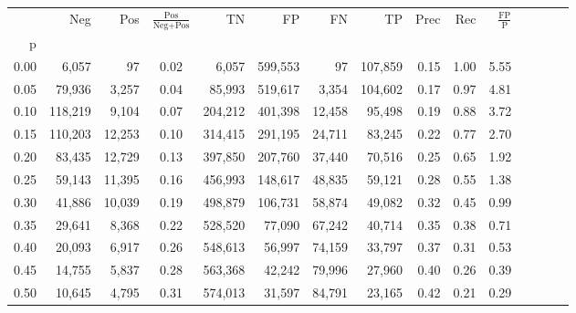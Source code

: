 \begin{tabular}{rrrcrrrrrrrrrrr}
\toprule
{} &      Neg &     Pos & $\frac{\text{Pos}}{\text{Neg}+\text{Pos}}$ &       TN &       FP &       FN &       TP &  Prec &   Rec & $\frac{\text{FP}}{\text{P}}$ \\
p    &          &         &                                            &          &          &          &          &       &       &                              \\
\midrule
0.00 &    6,057 &      97 &                                       0.02 &    6,057 &  599,553 &       97 &  107,859 &  0.15 &  1.00 &                         5.55 \\
0.05 &   79,936 &   3,257 &                                       0.04 &   85,993 &  519,617 &    3,354 &  104,602 &  0.17 &  0.97 &                         4.81 \\
0.10 &  118,219 &   9,104 &                                       0.07 &  204,212 &  401,398 &   12,458 &   95,498 &  0.19 &  0.88 &                         3.72 \\
0.15 &  110,203 &  12,253 &                                       0.10 &  314,415 &  291,195 &   24,711 &   83,245 &  0.22 &  0.77 &                         2.70 \\
0.20 &   83,435 &  12,729 &                                       0.13 &  397,850 &  207,760 &   37,440 &   70,516 &  0.25 &  0.65 &                         1.92 \\
0.25 &   59,143 &  11,395 &                                       0.16 &  456,993 &  148,617 &   48,835 &   59,121 &  0.28 &  0.55 &                         1.38 \\
0.30 &   41,886 &  10,039 &                                       0.19 &  498,879 &  106,731 &   58,874 &   49,082 &  0.32 &  0.45 &                         0.99 \\
0.35 &   29,641 &   8,368 &                                       0.22 &  528,520 &   77,090 &   67,242 &   40,714 &  0.35 &  0.38 &                         0.71 \\
0.40 &   20,093 &   6,917 &                                       0.26 &  548,613 &   56,997 &   74,159 &   33,797 &  0.37 &  0.31 &                         0.53 \\
0.45 &   14,755 &   5,837 &                                       0.28 &  563,368 &   42,242 &   79,996 &   27,960 &  0.40 &  0.26 &                         0.39 \\
0.50 &   10,645 &   4,795 &                                       0.31 &  574,013 &   31,597 &   84,791 &   23,165 &  0.42 &  0.21 &                         0.29 \\

\end{tabular}
